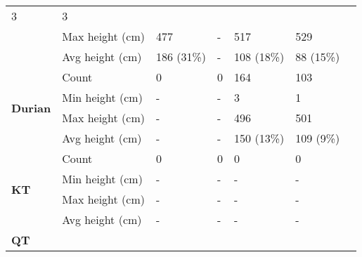 \begin{longtable}{|p{2cm}|p{2cm}|p{2cm}|p{2cm}|p{2cm}|p{2cm}|p{2cm}|}
						\multicolumn{1}{l|}{3} & 
						\multicolumn{1}{l|}{3} \\\cline{2-7} &
						\multicolumn{1}{l|}{Max height (cm)} & 
						\multicolumn{1}{l|}{477} & 
						\multicolumn{1}{l|}{-} &
						\multicolumn{1}{l|}{517} & 
						\multicolumn{1}{l|}{529} \\\cline{2-7} &
						\multicolumn{1}{l|}{Avg height (cm)} & 
						\multicolumn{1}{l|}{186 (31\%)} & 
						\multicolumn{1}{l|}{-} &
						\multicolumn{1}{l|}{108 (18\%)} & 
						\multicolumn{1}{l|}{88 (15\%)} \\\cline{2-7}
		\hline    
		\multirow{4}{*}{\textbf{Durian}} & 
						\multicolumn{1}{l|}{Count} & 
						\multicolumn{1}{l|}{0} & 
						\multicolumn{1}{l|}{0} &
						\multicolumn{1}{l|}{164} & 
						\multicolumn{1}{l|}{103} \\\cline{2-7} &
						\multicolumn{1}{l|}{Min height (cm)} & 
						\multicolumn{1}{l|}{-} & 
						\multicolumn{1}{l|}{-} &
						\multicolumn{1}{l|}{3} & 
						\multicolumn{1}{l|}{1} \\\cline{2-7} &
						\multicolumn{1}{l|}{Max height (cm)} & 
						\multicolumn{1}{l|}{-} & 
						\multicolumn{1}{l|}{-} &
						\multicolumn{1}{l|}{496} & 
						\multicolumn{1}{l|}{501} \\\cline{2-7} &
						\multicolumn{1}{l|}{Avg height (cm)} & 
						\multicolumn{1}{l|}{-} & 
						\multicolumn{1}{l|}{-} &
						\multicolumn{1}{l|}{150 (13\%)} & 
						\multicolumn{1}{l|}{109 (9\%)} \\\cline{2-7}
		\hline    
		\multirow{4}{*}{\textbf{KT}} & 
						\multicolumn{1}{l|}{Count} & 
						\multicolumn{1}{l|}{0} & 
						\multicolumn{1}{l|}{0} &
						\multicolumn{1}{l|}{0} & 
						\multicolumn{1}{l|}{0}  \\\cline{2-7} &
						\multicolumn{1}{l|}{Min height (cm)} & 
						\multicolumn{1}{l|}{-} & 
						\multicolumn{1}{l|}{-} &
						\multicolumn{1}{l|}{-} & 
						\multicolumn{1}{l|}{-} \\\cline{2-7} &
						\multicolumn{1}{l|}{Max height (cm)} & 
						\multicolumn{1}{l|}{-} & 
						\multicolumn{1}{l|}{-} &
						\multicolumn{1}{l|}{-} & 
						\multicolumn{1}{l|}{-} \\\cline{2-7} &
						\multicolumn{1}{l|}{Avg height (cm)} & 
						\multicolumn{1}{l|}{-} & 
						\multicolumn{1}{l|}{-} &
						\multicolumn{1}{l|}{-} & 
						\multicolumn{1}{l|}{-} \\\cline{2-7}
		\hline    
		\multirow{4}{*}{\textbf{QT}} & 

\end{longtable}
